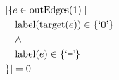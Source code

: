 \begin{align*}
&|\{e \in \mathrm{outEdges}(1)  \mid \\
&\quad \mathrm{label}(\mathrm{target}(e)) \in \{ \text{`\texttt{O}'} \}\\
&\quad \wedge\\
&\quad \mathrm{label}(e) \in \{ \text{`\texttt{=}'} \}\\
&\}| = 0
\end{align*}


